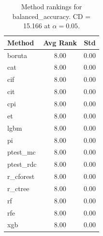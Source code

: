 \begin{table}[h]
\centering
\caption{Method rankings for balanced_accuracy. CD = 15.166 at $\alpha=0.05$.}
\label{tab:ranks_balanced_accuracy}
\begin{tabular}{lcc}
\toprule
Method & Avg Rank & Std \\
\midrule
boruta & 8.00 & 0.00 \\
cat & 8.00 & 0.00 \\
cif & 8.00 & 0.00 \\
cit & 8.00 & 0.00 \\
cpi & 8.00 & 0.00 \\
et & 8.00 & 0.00 \\
lgbm & 8.00 & 0.00 \\
pi & 8.00 & 0.00 \\
ptest_mc & 8.00 & 0.00 \\
ptest_rdc & 8.00 & 0.00 \\
r_cforest & 8.00 & 0.00 \\
r_ctree & 8.00 & 0.00 \\
rf & 8.00 & 0.00 \\
rfe & 8.00 & 0.00 \\
xgb & 8.00 & 0.00 \\
\bottomrule
\end{tabular}
\end{table}